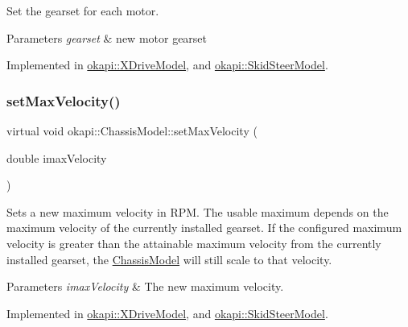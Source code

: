 Set the gearset for each motor.


\begin{DoxyParams}{Parameters}
{\em gearset} & new motor gearset \\
\hline
\end{DoxyParams}


Implemented in \mbox{\hyperlink{classokapi_1_1XDriveModel_ae9205c16e581786fecabaeb5066edab6}{okapi\+::\+X\+Drive\+Model}}, and \mbox{\hyperlink{classokapi_1_1SkidSteerModel_ad890989e345cfd7455436bc5dd6efdcc}{okapi\+::\+Skid\+Steer\+Model}}.

\mbox{\label{classokapi_1_1ChassisModel_ae7fcb4cc95fdd7fd3c8f8388b4a698b2}} 
\subsubsection{\texorpdfstring{setMaxVelocity()}{setMaxVelocity()}}
{\footnotesize\ttfamily virtual void okapi\+::\+Chassis\+Model\+::set\+Max\+Velocity (\begin{DoxyParamCaption}\item[{double}]{imax\+Velocity }\end{DoxyParamCaption})\hspace{0.3cm}{\ttfamily [pure virtual]}}

Sets a new maximum velocity in R\+PM. The usable maximum depends on the maximum velocity of the currently installed gearset. If the configured maximum velocity is greater than the attainable maximum velocity from the currently installed gearset, the \mbox{\hyperlink{classokapi_1_1ChassisModel}{Chassis\+Model}} will still scale to that velocity.


\begin{DoxyParams}{Parameters}
{\em imax\+Velocity} & The new maximum velocity. \\
\hline
\end{DoxyParams}


Implemented in \mbox{\hyperlink{classokapi_1_1XDriveModel_aec91f0569213bbca770ad4a25529beb6}{okapi\+::\+X\+Drive\+Model}}, and \mbox{\hyperlink{classokapi_1_1SkidSteerModel_a4beda353f201fa72fc8d31f47a08d473}{okapi\+::\+Skid\+Steer\+Model}}.

\mbox{\label{classokapi_1_1ChassisModel_a2fb261636b79e118f22530cc3fce4f41}} 

